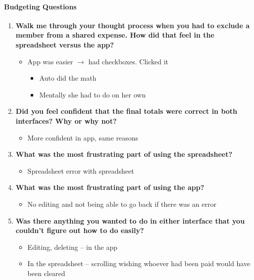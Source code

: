 \documentclass[12pt,a4paper]{article}
\begin{document}
\paragraph{Budgeting Questions}
\begin{enumerate}
    \item \textbf{Walk me through your thought process when you had to exclude a member from a shared expense. How did that feel in the spreadsheet versus the app?}
    \begin{itemize}
        \item App was easier $\rightarrow$ had checkboxes. Clicked it
        \begin{itemize}
            \item Auto did the math
            \item Mentally she had to do on her own
        \end{itemize}
    \end{itemize}

    \item \textbf{Did you feel confident that the final totals were correct in both interfaces? Why or why not?}
    \begin{itemize}
        \item More confident in app, same reasons
    \end{itemize}

    \item \textbf{What was the most frustrating part of using the spreadsheet?}
    \begin{itemize}
        \item Spreadsheet error with spreadsheet
    \end{itemize}

    \item \textbf{What was the most frustrating part of using the app?}
    \begin{itemize}
        \item No editing and not being able to go back if there was an error
    \end{itemize}

    \item \textbf{Was there anything you wanted to do in either interface that you couldn't figure out how to do easily?}
    \begin{itemize}
        \item Editing, deleting – in the app
        \item In the spreadsheet – scrolling wishing whoever had been paid would have been cleared
    \end{itemize}
\end{enumerate}
\end{document}
